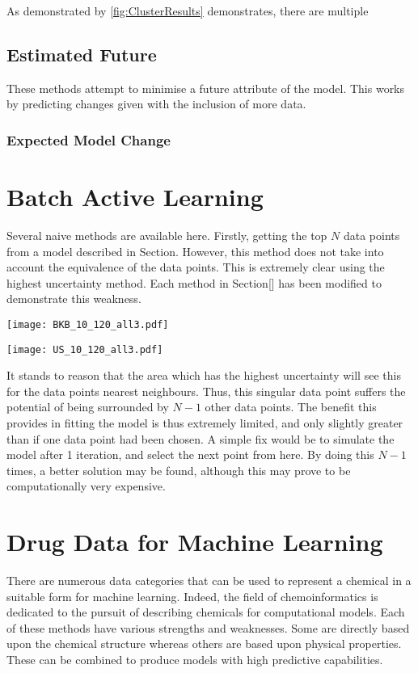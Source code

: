 As demonstrated by \ref{fig:ClusterResults} demonstrates, there are multiple

\subsection{Estimated Future}
These methods attempt to minimise a future attribute of the model. This works by predicting changes given with the inclusion of more data.

\subsubsection{Expected Model Change}
\blindtext[1]
\section{Batch Active Learning}
Several naive methods are available here. Firstly, getting the top $N$ data points from a model described in Section. However, this method does not take into account the equivalence of the data points. This is extremely clear using the highest uncertainty method. Each method in Section[] has been modified to demonstrate this weakness.

\begin{center}
  \texttt{[image: BKB\_10\_120\_all3.pdf]}
\end{center}
\begin{center}
  \texttt{[image: US\_10\_120\_all3.pdf]}
\end{center}

It stands to reason that the area which has the highest uncertainty will see this for the data points nearest neighbours. Thus, this singular data point suffers the potential of being surrounded by $N-1$ other data points. The benefit this provides in fitting the model is thus extremely limited, and only slightly greater than if one data point had been chosen. A simple fix would be to simulate the model after 1 iteration, and select the next point from here. By doing this $N-1$ times, a better solution may be found, although this may prove to be computationally very expensive.

\section{Drug Data for Machine Learning}
There are numerous data categories that can be used to represent a chemical in a suitable form for machine learning. Indeed, the field of chemoinformatics is dedicated to the pursuit of describing chemicals for computational models. Each of these methods have various strengths and weaknesses. Some are directly based upon the chemical structure whereas others are based upon physical properties. These can be combined to produce models with high predictive capabilities.

